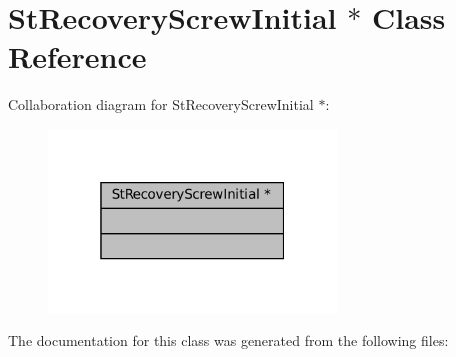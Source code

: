 \hypertarget{classStRecoveryScrewInitial_01_5}{}\section{St\+Recovery\+Screw\+Initial $\ast$ Class Reference}
\label{classStRecoveryScrewInitial_01_5}


Collaboration diagram for St\+Recovery\+Screw\+Initial $\ast$\+:
\nopagebreak
\begin{figure}[H]
\begin{center}
\leavevmode
\includegraphics[width=217pt]{classStRecoveryScrewInitial_01_5__coll__graph}
\end{center}
\end{figure}


The documentation for this class was generated from the following files\+: